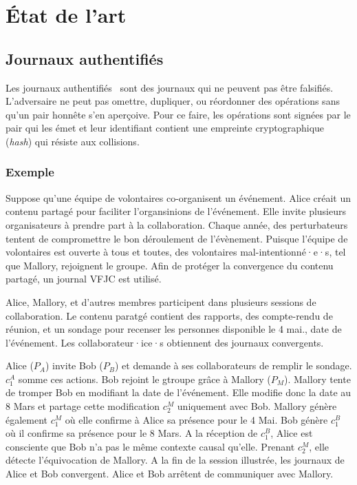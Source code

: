 
\chapter{État de l'art}
\label{ch:state-of-the-art}

\minitoc
\bigskip


\section{Journaux authentifiés}

Les journaux authentifiés~\autocite{mahajan_depot_2011,truong_authenticating_2012} sont des journaux qui ne peuvent pas être falsifiés.
L'adversaire ne peut pas omettre, dupliquer, ou réordonner des opérations sans qu'un pair honnête s'en aperçoive.
Pour ce faire, les opérations sont signées par le pair qui les émet et leur identifiant contient une empreinte cryptographique (\emph{hash}) qui résiste aux collisions.


\subsection{Exemple}

Suppose qu'une équipe de volontaires co-organisent un événement.
Alice créait un contenu partagé pour faciliter l'organsinions de l'événement.
Elle invite plusieurs organisateurs à prendre part à la collaboration.
Chaque année, des perturbateurs tentent de compromettre le bon déroulement de l'évènement.
Puisque l'équipe de volontaires est ouverte à tous et toutes, des volontaires mal-intentionné·e·s, tel que Mallory, rejoignent le groupe.
Afin de protéger la convergence du contenu partagé, un journal \ac{VFJC} est utilisé.

Alice, Mallory, et d'autres membres participent dans plusieurs sessions de collaboration.
Le contenu paratgé contient des rapports, des compte-rendu de réunion, et un sondage pour recenser les personnes disponible le 4 mai., date de l'événement.
Les collaborateur·ice·s obtiennent des journaux convergents.

Alice ($P_A$) invite Bob ($P_B$) et demande à ses collaborateurs de remplir le sondage.
$c^A_1$ somme ces actions.
Bob rejoint le gtroupe grâce à Mallory ($P_M$).
Mallory tente de tromper Bob en modifiant la date de l'événement.
Elle modifie donc la date au 8 Mars et partage cette modification $c^M_2$ uniquement avec Bob.
Mallory génère également $c^M_1$ où elle confirme à Alice sa présence pour le 4 Mai.
Bob génère $c^B_1$ où il confirme sa présence pour le 8 Mars.
A la réception de $c^B_1$, Alice est consciente que Bob n'a pas le même contexte causal qu'elle.
Prenant $c^M_2$, elle détecte l'équivocation de Mallory.
A la fin de la session illustrée, les journaux de Alice et Bob convergent.
Alice et Bob arrêtent de communiquer avec Mallory.

